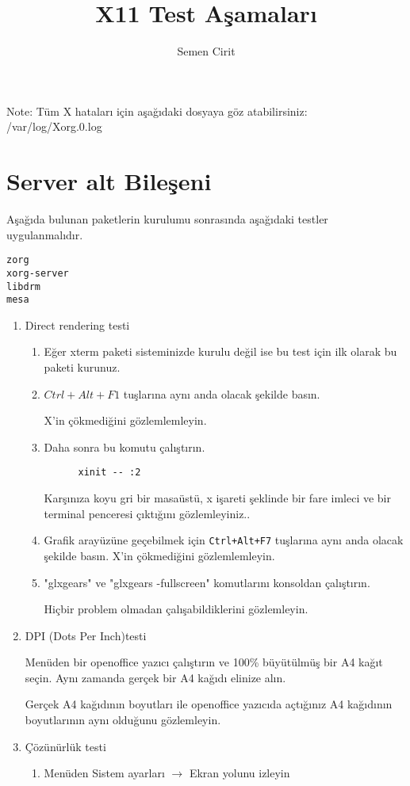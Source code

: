 \documentclass[a4paper,10pt]{article}
\title{X11 Test Aşamaları}
\author{Semen Cirit}
\begin{document}
\maketitle

 Note:	
  	Tüm X hataları için  aşağıdaki dosyaya göz atabilirsiniz:
	/var/log/Xorg.0.log  

\section{Server alt Bileşeni}

Aşağıda bulunan paketlerin kurulumu sonrasında aşağıdaki testler uygulanmalıdır. 
\begin{verbatim}
zorg    
xorg-server
libdrm
mesa
\end{verbatim}


\begin{enumerate}
  \item Direct rendering testi
    \begin{enumerate}
    \item Eğer xterm paketi sisteminizde kurulu değil ise bu test için ilk olarak bu paketi kurunuz.
    \item   $Ctrl+Alt+F1$ tuşlarına aynı anda olacak şekilde basın.

	    X'in çökmediğini gözlemlemleyin.
    \item  Daha sonra bu komutu çalıştırın.
	  \begin{verbatim}
	  xinit -- :2
	  \end{verbatim}
	  Karşınıza koyu gri bir masaüstü, x işareti şeklinde bir fare imleci ve bir terminal penceresi çıktığını gözlemleyiniz..
    \item Grafik arayüzüne geçebilmek için \texttt{Ctrl+Alt+F7} tuşlarına aynı anda olacak şekilde basın.    
	   X'in çökmediğini gözlemlemleyin.
    \item "glxgears" ve "glxgears -fullscreen" komutlarını konsoldan çalıştırın.

	  Hiçbir problem olmadan çalışabildiklerini gözlemleyin.
    \end{enumerate}

  \item DPI (Dots Per Inch)testi
    
        Menüden bir openoffice yazıcı çalıştırın ve 100\% büyütülmüş bir A4 kağıt seçin. Aynı zamanda gerçek bir A4 kağıdı elinize alın.

        Gerçek A4 kağıdının boyutları ile openoffice yazıcıda açtığınız A4 kağıdının boyutlarının aynı olduğunu gözlemleyin.
  \item Çözünürlük testi
     \begin{enumerate}
      \item Menüden Sistem ayarları $\rightarrow$ Ekran yolunu izleyin


\end{enumerate}
\end{enumerate}
\end{document}
